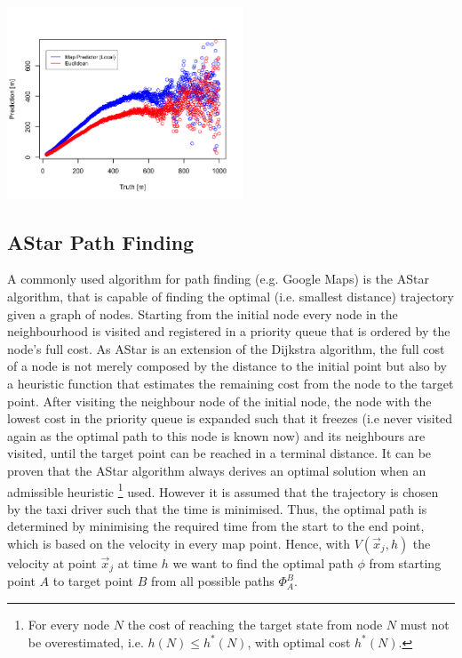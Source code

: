 \documentclass{article}
\newenvironment{Figure}
{\par\medskip\noindent\minipage{\linewidth}}
{\endminipage\par\medskip}
\begin{document}
\begin{multicols}{2}
\begin{Figure}
\begin{center}
\includegraphics[width=7cm]{local_vs_euc.png}
\end{center}
\label{fig:local_error_euc}
\end{Figure}

\subsection{AStar Path Finding}
A commonly used algorithm for path finding (e.g. Google Maps) is the AStar algorithm, that is capable of finding the optimal (i.e. smallest distance) trajectory given a graph of nodes. Starting from the initial node every node in the neighbourhood is visited and registered in a priority queue that is ordered by the  node's full cost. As AStar is an extension of the Dijkstra algorithm, the full cost of a node is not merely composed by the distance to the initial point but also by a heuristic function that estimates the remaining cost from the node to the target point. After visiting the neighbour node of the initial node, the node with the lowest cost in the priority queue is expanded such that it freezes (i.e never visited again as the optimal path to this node is known now) and its neighbours are visited, until the target point can be reached in a terminal distance. It can be proven that the AStar algorithm always derives an optimal solution when an admissible heuristic \footnote{For every node $N$ the cost of reaching the target state from node $N$ must not be overestimated, i.e. $h(N) \leq h^*(N)$, with optimal cost $h^*(N)$.} used. However it is assumed that the trajectory is chosen by the taxi driver such that the time is minimised. Thus, the optimal path is determined by minimising the required time from the start to the end point, which is based on the velocity in every map point. Hence, with $V(\vec{x}_j, h)$ the velocity at point $\vec{x}_j$ at time $h$ we want to find the optimal path $\phi$ from starting point $A$ to target point $B$ from all possible paths $\Phi_A^B$.


\end{multicols}
\end{document}
